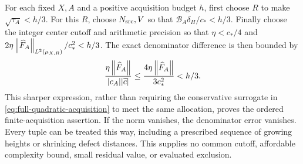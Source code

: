 For each fixed \(X,A\) and a positive acquisition budget \(h\),
first choose \(R\) to make \(\sqrt{\tau_A}<h/3\).
For this \(R\), choose \(N_{\rm src},V\) so that
\(\mathcal B_A\delta_H/c_*<h/3\).
Finally choose the integer center cutoff and arithmetic precision so that
\(\eta<c_*/4\) and
\(2\eta\left\lVert\widehat F_A\right\rVert_{L^2(\mu_{X,R})}/c_*^2<h/3\).
The exact denominator difference is then bounded by
\[
 \frac{\eta\left\lVert\widehat F_A\right\rVert}{|c_A||\widetilde c|}
 \le\frac{4\eta\left\lVert\widehat F_A\right\rVert}{3c_*^2}<h/3.
\]
This sharper expression, rather than requiring the conservative
surrogate in \eqref{eq:full-quadratic-acquisition} to meet the same
allocation, proves the ordered finite-acquisition assertion.
If the norm vanishes, the denominator error vanishes.
Every tuple can be treated this way, including a prescribed sequence
of growing heights or shrinking defect distances. This supplies no
common cutoff, affordable complexity bound, small residual value,
or evaluated exclusion.

